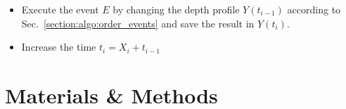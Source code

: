 \documentclass[11pt, a4paper]{thesis}  %
\begin{document}
\begin{itemize}
	\item Execute the event $E$ by changing the depth profile $Y(t_{i-1})$ according to 
	Sec.~\ref{section:algo:order_events} and save the result in $Y(t_{i})$.
	
	\item Increase the time $t_{i} = X_i + t_{i-1}$
\end{itemize}

%
%

\chapter{Materials \& Methods}
\label{chapter:material_methods}

\end{document}
